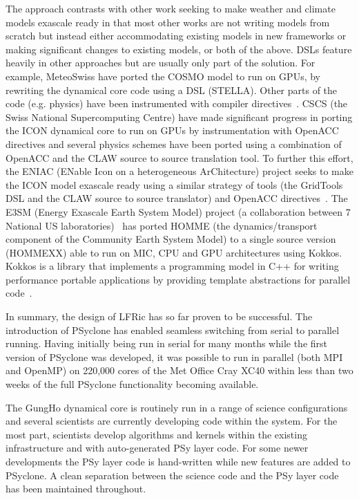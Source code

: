 \documentclass[review,times]{elsarticle}
\begin{document}
The approach contrasts with other work seeking to make
weather and climate models exascale ready in that most other works
are not writing models from scratch but instead either accommodating
existing models in new frameworks or making significant changes to
existing models, or both of the above. DSLs feature heavily in other
approaches but are usually only part of the solution. For example,
MeteoSwiss have ported the COSMO model to run on GPUs, by
rewriting the dynamical core code using a DSL (STELLA). Other parts
of the code (e.g. physics) have been instrumented with compiler
directives~\cite{JSFI17}. CSCS (the Swiss National  Supercomputing
Centre) have made significant progress in porting the ICON dynamical
core to run on GPUs by instrumentation with OpenACC directives and
several physics schemes have been ported using a combination of
OpenACC and the CLAW source to source translation tool. To further
this effort, the ENIAC (ENable Icon on a heterogeneous ArChitecture)
project seeks to make the ICON model exascale ready using a similar
strategy of tools (the GridTools DSL and the CLAW source to source
translator) and OpenACC directives~\cite{ENIACDocs}.
The E3SM (Energy Exascale Earth System Model) project (a collaboration
between 7 National US laboratories)~\cite{E3SMDocs} has ported
HOMME (the dynamics/transport component of the Community Earth System
Model) to a single source version (HOMMEXX) able to run on MIC,
CPU and GPU architectures using Kokkos. Kokkos is a library that
implements a programming model in C++ for writing performance
portable applications by providing template abstractions for parallel
code~\cite{KokkosGitHub}.

In summary, the design of LFRic has so far proven to be successful. The
introduction of PSyclone has enabled seamless switching from serial to
parallel running. Having initially being run in serial for many
months while the first version of PSyclone was developed, it was possible
to run in parallel (both MPI and OpenMP) on 220,000 cores of the Met Office
Cray XC40 within less than two weeks of the full PSyclone functionality
becoming available.

The GungHo dynamical core is routinely run in a range of science
configurations and several scientists are currently developing code within
the system. For the most part, scientists develop algorithms and kernels
within the existing infrastructure and with auto-generated PSy layer
code. For some newer developments the PSy layer code is hand-written
while new features are added to PSyclone. A clean separation between
the science code and the PSy layer code has been maintained
throughout. 
\end{document}
